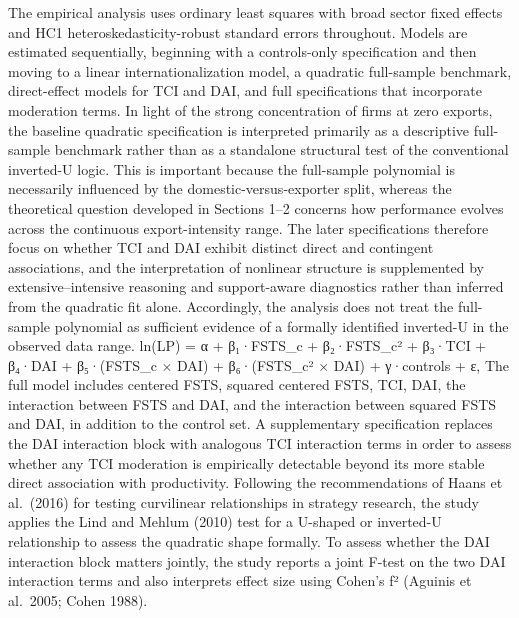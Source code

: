 \documentclass[
  12pt,a4paper]{article}
\begin{document}
The empirical analysis uses ordinary least squares with broad sector
fixed effects and HC1 heteroskedasticity-robust standard errors
throughout. Models are estimated sequentially, beginning with a
controls-only specification and then moving to a linear
internationalization model, a quadratic full-sample benchmark,
direct-effect models for TCI and DAI, and full specifications that
incorporate moderation terms. In light of the strong concentration of
firms at zero exports, the baseline quadratic specification is
interpreted primarily as a descriptive full-sample benchmark rather than
as a standalone structural test of the conventional inverted-U logic.
This is important because the full-sample polynomial is necessarily
influenced by the domestic-versus-exporter split, whereas the
theoretical question developed in Sections 1--2 concerns how performance
evolves across the continuous export-intensity range. The later
specifications therefore focus on whether TCI and DAI exhibit distinct
direct and contingent associations, and the interpretation of nonlinear
structure is supplemented by extensive--intensive reasoning and
support-aware diagnostics rather than inferred from the quadratic fit
alone. Accordingly, the analysis does not treat the full-sample
polynomial as sufficient evidence of a formally identified inverted-U in
the observed data range. ln(LP) = α + β₁·FSTS\_c + β₂·FSTS\_c² + β₃·TCI
+ β₄·DAI + β₅·(FSTS\_c × DAI) + β₆·(FSTS\_c² × DAI) + γ·controls + ε,
The full model includes centered FSTS, squared centered FSTS, TCI, DAI,
the interaction between FSTS and DAI, and the interaction between
squared FSTS and DAI, in addition to the control set. A supplementary
specification replaces the DAI interaction block with analogous TCI
interaction terms in order to assess whether any TCI moderation is
empirically detectable beyond its more stable direct association with
productivity. Following the recommendations of Haans et al.~(2016) for
testing curvilinear relationships in strategy research, the study
applies the Lind and Mehlum (2010) test for a U-shaped or inverted-U
relationship to assess the quadratic shape formally. To assess whether
the DAI interaction block matters jointly, the study reports a joint
F-test on the two DAI interaction terms and also interprets effect size
using Cohen's f² (Aguinis et al.~2005; Cohen 1988).
\end{document}
